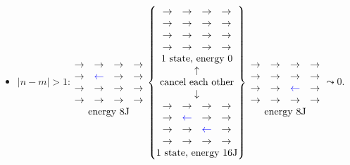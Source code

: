 \begin{itemize}
\item $\vert n - m \vert > 1$: 
$\begin{matrix}
	\\
	\begin{matrix} \rightarrow & \rightarrow & \rightarrow & \rightarrow \\  \rightarrow & \textcolor{blue}{\leftarrow} & \rightarrow & \rightarrow \\ \rightarrow & \rightarrow & \rightarrow & \rightarrow \\ \rightarrow & \rightarrow & \rightarrow & \rightarrow \\ \end{matrix} \\
	\text{energy 8J} \\
\end{matrix}$
$\begin{Bmatrix}
	\begin{matrix} \rightarrow & \rightarrow & \rightarrow & \rightarrow \\  \rightarrow & \rightarrow & \rightarrow & \rightarrow \\ \rightarrow & \rightarrow & \rightarrow & \rightarrow \\ \rightarrow & \rightarrow & \rightarrow & \rightarrow \\ \end{matrix} \\
	\text{1 state, energy 0} \\ 
	\uparrow \\
	\text{cancel each other} \\
	\downarrow \\
	\begin{matrix} \rightarrow & \rightarrow & \rightarrow & \rightarrow \\  \rightarrow & \textcolor{blue}{\leftarrow} & \rightarrow & \rightarrow \\ \rightarrow & \rightarrow & \textcolor{blue}{\leftarrow} & \rightarrow \\ \rightarrow & \rightarrow & \rightarrow & \rightarrow \\ \end{matrix} \\
	\text{1 state, energy 16J} \\
\end{Bmatrix}$
$\begin{matrix}
	\\
	\begin{matrix} \rightarrow & \rightarrow & \rightarrow & \rightarrow \\  \rightarrow & \rightarrow & \rightarrow & \rightarrow \\ \rightarrow & \rightarrow & \textcolor{blue}{\leftarrow} & \rightarrow \\ \rightarrow & \rightarrow & \rightarrow & \rightarrow \\ \end{matrix} \\
	\text{energy 8J} \\
\end{matrix}$
$\leadsto 0$.
\end{itemize}

